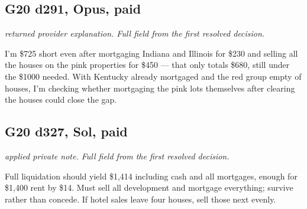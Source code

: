 \subsection*{G20 d291, Opus, paid}
{\small\textit{returned provider explanation. Full field from the first resolved decision.}\par I'm \$725 short even after mortgaging Indiana and Illinois for \$230 and selling all the houses on the pink properties for \$450 — that only totals \$680, still under the \$1000 needed. With Kentucky already mortgaged and the red group empty of houses, I'm checking whether mortgaging the pink lots themselves after clearing the houses could close the gap.\par \par}
\subsection*{G20 d327, Sol, paid}
{\small\textit{applied private note. Full field from the first resolved decision.}\par Full liquidation should yield \$1,414 including cash and all mortgages, enough for \$1,400 rent by \$14. Must sell all development and mortgage everything; survive rather than concede. If hotel sales leave four houses, sell those next evenly.\par}
